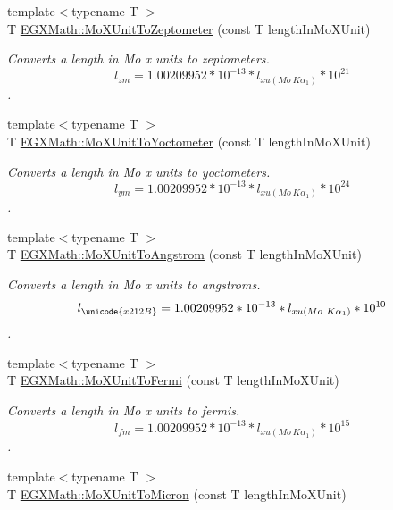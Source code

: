 \begin{DoxyCompactItemize}
{\footnotesize template$<$typename T $>$ }\\T \mbox{\hyperlink{group___e_g_x_math-_conversions-_length_conversions-_non-_s_i-_mo_x_unit-_s_i_gaab354c6959e3f8243ea2be8b9e500727}{E\+G\+X\+Math\+::\+Mo\+X\+Unit\+To\+Zeptometer}} (const T length\+In\+Mo\+X\+Unit)
\begin{DoxyCompactList}\small\item\em Converts a length in Mo x units to zeptometers. \[ l_{zm}=1.00209952*10^{-13} * l_{xu(Mo\ K\alpha_1)} * 10^{21} \]. \end{DoxyCompactList}\item 
{\footnotesize template$<$typename T $>$ }\\T \mbox{\hyperlink{group___e_g_x_math-_conversions-_length_conversions-_non-_s_i-_mo_x_unit-_s_i_gadfb737fe68fc22991e2c7616212480b6}{E\+G\+X\+Math\+::\+Mo\+X\+Unit\+To\+Yoctometer}} (const T length\+In\+Mo\+X\+Unit)
\begin{DoxyCompactList}\small\item\em Converts a length in Mo x units to yoctometers. \[ l_{ym}=1.00209952*10^{-13} * l_{xu(Mo\ K\alpha_1)} * 10^{24} \]. \end{DoxyCompactList}\item 
{\footnotesize template$<$typename T $>$ }\\T \mbox{\hyperlink{group___e_g_x_math-_conversions-_length_conversions-_non-_s_i-_mo_x_unit-_non-_s_i_ga1846652500863bdef905f209f3c5e0ae}{E\+G\+X\+Math\+::\+Mo\+X\+Unit\+To\+Angstrom}} (const T length\+In\+Mo\+X\+Unit)
\begin{DoxyCompactList}\small\item\em Converts a length in Mo x units to angstroms. \[ l_{\unicode{x212B}}=1.00209952*10^{-13} * l_{xu(Mo\ K\alpha_1)} * 10^{10} \]. \end{DoxyCompactList}\item 
{\footnotesize template$<$typename T $>$ }\\T \mbox{\hyperlink{group___e_g_x_math-_conversions-_length_conversions-_non-_s_i-_mo_x_unit-_non-_s_i_gac8cb731cb2dd7df67818cade6f80c011}{E\+G\+X\+Math\+::\+Mo\+X\+Unit\+To\+Fermi}} (const T length\+In\+Mo\+X\+Unit)
\begin{DoxyCompactList}\small\item\em Converts a length in Mo x units to fermis. \[ l_{fm}=1.00209952*10^{-13} * l_{xu(Mo\ K\alpha_1)} * 10^{15} \]. \end{DoxyCompactList}\item 
{\footnotesize template$<$typename T $>$ }\\T \mbox{\hyperlink{group___e_g_x_math-_conversions-_length_conversions-_non-_s_i-_mo_x_unit-_non-_s_i_ga8fa37a1f86f7b01d2ca395fb7d2b75ce}{E\+G\+X\+Math\+::\+Mo\+X\+Unit\+To\+Micron}} (const T length\+In\+Mo\+X\+Unit)

\end{DoxyCompactItemize}
